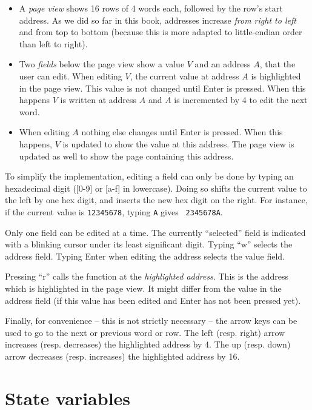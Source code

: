 \begin{itemize}
  \item A {\em page view} shows 16 rows of 4 words each, followed by the row's
  start address. As we did so far in this book, addresses increase {\em from
  right to left} and from top to bottom (because this is more adapted to
  little-endian order than left to right).

  \item Two {\em fields} below the page view show a value $V$ and an address
  $A$, that the user can edit. When editing $V$, the current value at address
  $A$ is highlighted in the page view. This value is not changed until Enter is
  pressed. When this happens $V$ is written at address $A$ and $A$ is
  incremented by 4 to edit the next word.

  \item When editing $A$ nothing else changes until Enter is pressed. When this
  happens, $V$ is updated to show the value at this address. The page view is
  updated as well to show the page containing this address.
\end{itemize}

To simplify the implementation, editing a field can only be done by typing an
hexadecimal digit ([0-9] or [a-f] in lowercase). Doing so shifts the current
value to the left by one hex digit, and inserts the new hex digit on the right.
For instance, if the current value is {\tt 12345678}, typing {\tt A} gives {\tt
2345678A}.

Only one field can be edited at a time. The currently ``selected'' field is
indicated with a blinking cursor under its least significant digit. Typing
``w'' selects the address field. Typing Enter when editing the address selects
the value field.

Pressing ``r'' calls the function at the {\em highlighted address}. This is the
address which is highlighted in the page view. It might differ from the value
in the address field (if this value has been edited and Enter has not been
pressed yet).

Finally, for convenience -- this is not strictly necessary -- the arrow keys
can be used to go to the next or previous word or row. The left (resp. right)
arrow increases (resp. decreases) the highlighted address by 4. The up (resp.
down) arrow decreases (resp. increases) the highlighted address by 16.

\section{State variables}\label{subsection:med-state-variables}

